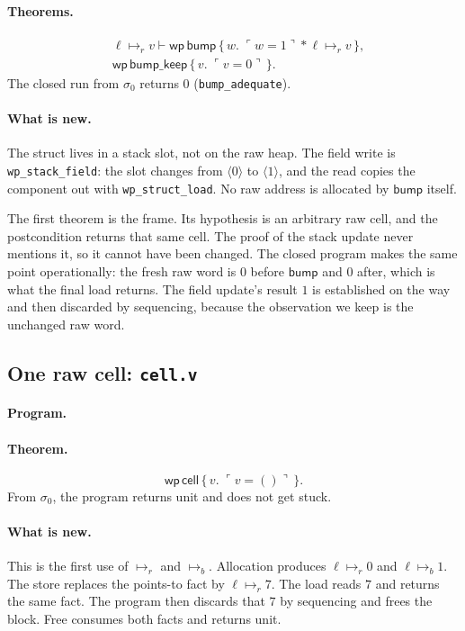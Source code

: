 \documentclass[11pt]{article}
\newcommand{\Unit}{\mathsf{()}}
\newcommand{\ptsr}{\mathrel{\mapsto_{r}}}
\newcommand{\ptsb}{\mathrel{\mapsto_{b}}}
\newcommand{\sep}{\mathbin{*}}
\newcommand{\Wpre}{\mathsf{wp}}
\newcommand{\pure}[1]{\ulcorner #1 \urcorner}
\begin{document}
\paragraph{Theorems.}
\[
\begin{aligned}
&\ell \ptsr v \vdash
  \Wpre\,\mathsf{bump}\,\{\,w.\; \pure{w=1} \sep \ell \ptsr v\,\},\\
&\Wpre\,\mathsf{bump\_keep}\,\{\,v.\; \pure{v=0}\,\}.
\end{aligned}
\]
The closed run from \(\sigma_0\) returns \(0\) (\texttt{bump\_adequate}).

\paragraph{What is new.}
The struct lives in a stack slot, not on the raw heap.
The field write is \texttt{wp\_stack\_field}: the slot changes from \(\langle 0\rangle\) to \(\langle 1\rangle\), and the read copies the component out with \texttt{wp\_struct\_load}.
No raw address is allocated by \(\mathsf{bump}\) itself.

The first theorem is the frame.
Its hypothesis is an arbitrary raw cell, and the postcondition returns that same cell.
The proof of the stack update never mentions it, so it cannot have been changed.
The closed program makes the same point operationally: the fresh raw word is \(0\) before \(\mathsf{bump}\) and \(0\) after, which is what the final load returns.
The field update's result \(1\) is established on the way and then discarded by sequencing, because the observation we keep is the unchanged raw word.

\subsection{One raw cell: \texttt{cell.v}}

\paragraph{Program.}\mbox{}\par


\paragraph{Theorem.}
\[
\Wpre\,\mathsf{cell}\,\{\,v.\; \pure{v=\Unit}\,\}.
\]
From \(\sigma_0\), the program returns unit and does not get stuck.

\paragraph{What is new.}
This is the first use of \(\ptsr\) and \(\ptsb\).
Allocation produces \(\ell \ptsr 0\) and \(\ell \ptsb 1\).
The store replaces the points-to fact by \(\ell \ptsr 7\).
The load reads \(7\) and returns the same fact.
The program then discards that \(7\) by sequencing and frees the block.
Free consumes both facts and returns unit.
\end{document}
